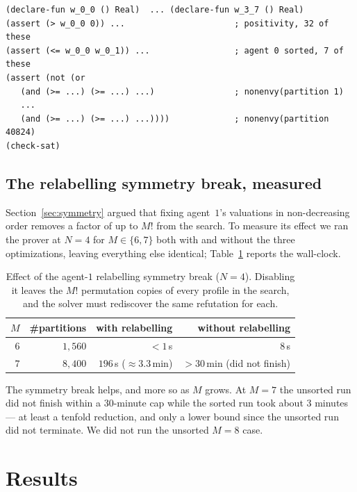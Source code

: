 \documentclass[11pt,a4paper]{article}
\theoremstyle{definition}
\theoremstyle{plain}
\newcommand{\agents}{N}
\newcommand{\goods}{M}
\begin{document}
\begin{lstlisting}[caption={Shape of the exported SMT-LIB~2 query (abridged).},label={lst:smtlib}]
(declare-fun w_0_0 () Real)  ... (declare-fun w_3_7 () Real)
(assert (> w_0_0 0)) ...                      ; positivity, 32 of these
(assert (<= w_0_0 w_0_1)) ...                 ; agent 0 sorted, 7 of these
(assert (not (or
   (and (>= ...) (>= ...) ...)                ; nonenvy(partition 1)
   ...
   (and (>= ...) (>= ...) ...))))             ; nonenvy(partition 40824)
(check-sat)
\end{lstlisting}

\subsection{The relabelling symmetry break, measured}
\label{sec:bench}

Section~\ref{sec:symmetry} argued that fixing agent~$1$'s valuations in
non-decreasing order removes a factor of up to $\goods!$ from the search. To
measure its effect we ran the prover at $\agents=4$ for $\goods\in\{6,7\}$ both
with and without the three optimizations, leaving everything else identical;
Table~\ref{tab:bench} reports the wall-clock.

\begin{table}[h]
\centering
\begin{tabular}{rrrr}
\toprule
$\goods$ & \#partitions & with relabelling & without relabelling\\
\midrule
$6$ & $1{,}560$ & $<1$\,s & $8$\,s\\
$7$ & $8{,}400$ & $196$\,s ($\approx 3.3$\,min) & $>30$\,min (did not finish)\\
\bottomrule
\end{tabular}
\caption{Effect of the agent-$1$ relabelling symmetry break ($\agents=4$).
Disabling it leaves the $\goods!$ permutation copies of every profile in the
search, and the solver must rediscover the same refutation for each.}
\label{tab:bench}
\end{table}

The symmetry break helps, and more so as $\goods$ grows. At $\goods=7$ the
unsorted run did not finish within a $30$-minute cap while the sorted run took
about $3$ minutes --- at least a tenfold reduction, and only a lower bound since
the unsorted run did not terminate. We did not run the unsorted $\goods=8$ case.

\section{Results}
\label{sec:results}
\end{document}

